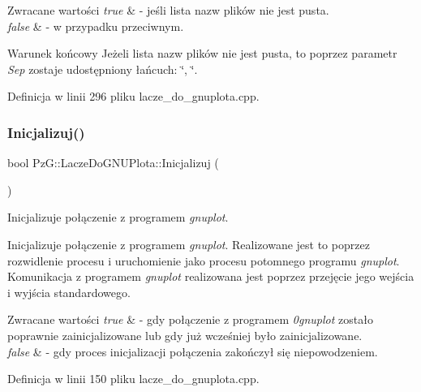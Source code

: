 \begin{DoxyRetVals}{Zwracane wartości}
{\em true} & -\/ jeśli lista nazw plików nie jest pusta. \\
\hline
{\em false} & -\/ w przypadku przeciwnym. \\
\hline
\end{DoxyRetVals}
\begin{DoxyPostcond}{Warunek końcowy}
Jeżeli lista nazw plików nie jest pusta, to poprzez parametr {\itshape Sep} zostaje udostępniony łańcuch\+: \char`\"{}, \char`\"{}. 
\end{DoxyPostcond}


Definicja w linii 296 pliku lacze\+\_\+do\+\_\+gnuplota.\+cpp.

\mbox{\label{class_pz_g_1_1_lacze_do_g_n_u_plota_a200ce6bdb980c314a9eafe49e8f2dd5e}} 
\subsubsection{\texorpdfstring{Inicjalizuj()}{Inicjalizuj()}}
{\footnotesize\ttfamily bool Pz\+G\+::\+Lacze\+Do\+G\+N\+U\+Plota\+::\+Inicjalizuj (\begin{DoxyParamCaption}{ }\end{DoxyParamCaption})}



Inicjalizuje połączenie z programem {\itshape gnuplot}. 

Inicjalizuje połączenie z programem {\itshape gnuplot}. Realizowane jest to poprzez rozwidlenie procesu i uruchomienie jako procesu potomnego programu {\itshape gnuplot}. Komunikacja z programem {\itshape gnuplot} realizowana jest poprzez przejęcie jego wejścia i wyjścia standardowego.


\begin{DoxyRetVals}{Zwracane wartości}
{\em true} & -\/ gdy połączenie z programem {\itshape 0gnuplot} zostało poprawnie zainicjalizowane lub gdy już wcześniej było zainicjalizowane. \\
\hline
{\em false} & -\/ gdy proces inicjalizacji połączenia zakończył się niepowodzeniem. \\
\hline
\end{DoxyRetVals}


Definicja w linii 150 pliku lacze\+\_\+do\+\_\+gnuplota.\+cpp.

